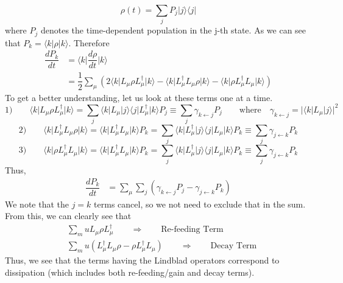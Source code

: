\documentclass[aps,prb,onecolumn,notitlepage,showpacs,floatfix,superscriptaddress]{revtex4-1}
\begin{document}
\begin{equation}
\rho(t) = \sum_j P_j \vert j \rangle \langle j \vert
\end{equation}
where $P_j$ denotes the time-dependent population in the j-th state. As we can see that $P_k = \langle k \vert \rho \vert k \rangle$. Therefore
\begin{equation}
\begin{split}
\dfrac{dP_k}{dt} &= \langle k \vert \dfrac{d\rho}{dt} \vert k \rangle \\
&=  \dfrac{1}{2} \sum_\mu \left( 2 \langle k \vert L_\mu \rho L_\mu^\dagger\vert k \rangle  - \langle k \vert L_\mu^\dagger L_\mu \rho \vert k \rangle - \langle k \vert \rho L_\mu^\dagger L_\mu \vert k \rangle  \right)
\end{split}
\end{equation}
To get a better understanding, let us look at these terms one at a time.
\begin{equation}
\text{1)} \qquad \langle k \vert L_\mu \rho L_\mu^\dagger\vert k \rangle = \sum_j \langle k \vert L_\mu \vert j \rangle \langle j \vert L_\mu^\dagger\vert k \rangle P_j \equiv \sum_j \gamma_{k \leftarrow j} P_j \qquad \text{where} \quad  \gamma_{k \leftarrow j} = \vert \langle k \vert L_\mu \vert j \rangle \vert^2
\end{equation}
\begin{equation}
\text{2)} \qquad \langle k \vert L_\mu^\dagger  L_\mu \rho \vert k \rangle = \langle k \vert L_\mu^\dagger L_\mu \vert k \rangle P_k = \sum_j \langle k \vert L_\mu^\dagger \vert j \rangle \langle j \vert L_\mu \vert k \rangle P_k \equiv \sum_j \gamma_{j \leftarrow k} P_k
\end{equation}
\begin{equation}
\text{3)} \qquad \langle k \vert \rho  L_\mu^\dagger L_\mu \vert k \rangle = \langle k \vert L_\mu^\dagger L_\mu \vert k \rangle P_k = \sum_j \langle k \vert L_\mu^\dagger \vert j \rangle \langle j \vert L_\mu \vert k \rangle P_k \equiv \sum_j \gamma_{j \leftarrow k} P_k
\end{equation}
Thus,
\begin{equation}
\begin{split}
\dfrac{dP_k}{dt} &= \sum_\mu \sum_j \left( \gamma_{k \leftarrow j} P_j - \gamma_{j \leftarrow k} P_k  \right)
\end{split}
\end{equation}
We note that the $j=k$ terms cancel, so we not need to exclude that in the sum. From this, we can clearly see that
\begin{equation}
\begin{split}
& \sum_mu L_\mu \rho L_\mu^\dagger \qquad \Rightarrow \qquad \text{Re-feeding Term} \\
&\sum_mu \left(L_\mu^\dagger L_\mu \rho - \rho L_\mu^\dagger L_\mu \right) \qquad \Rightarrow \qquad \text{Decay Term} 
\end{split}
\end{equation}
Thus, we see that the terms having the Lindblad operators correspond to dissipation (which includes both re-feeding/gain and decay terms).
\end{document}
